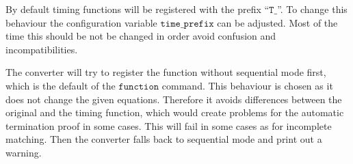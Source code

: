 By default timing functions will be registered with the prefix ``$\texttt{T\_}$''.
To change this behaviour the configuration variable $\texttt{time\_prefix}$ can be adjusted.
Most of the time this should be not be changed in order avoid confusion and incompatibilities.

The converter will try to register the function without sequential mode first, which is the default of the $\texttt{function}$ command.
This behaviour is chosen as it does not change the given equations.
Therefore it avoids differences between the original and the timing function,
which would create problems for the automatic termination proof in some cases.
This will fail in some cases as for incomplete matching.
Then the converter falls back to sequential mode and print out a warning.
